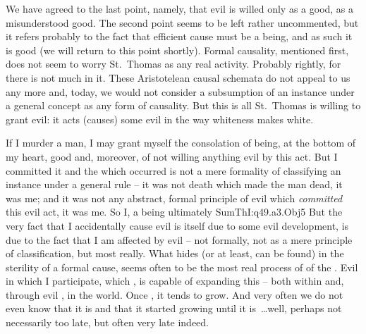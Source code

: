 We have agreed to the last point, namely, that evil is willed only as a good, as
a misunderstood good. The second point seems to be left rather uncommented, but
it refers probably to the fact that efficient cause must be a being, and as such
it is good (we will return to this point shortly). Formal causality, mentioned
first, does not seem to worry St.~Thomas as any real activity. Probably rightly, for
there is not much  in it. These Aristotelean causal schemata
do not appeal to us any more and, today, we would not consider a subsumption of
an instance under a general concept as any form of causality. But this is all
St.~Thomas is willing to grant evil: it acts (causes) some evil
in the way whiteness makes white.

If I murder a man, I may grant myself the consolation of being, at the bottom of
my heart, good and, moreover, of not willing anything evil by this act. But I
committed it and the  which occurred is not a mere
formality of classifying an instance under a general rule -- it was not death
which made the man dead, it was me; and it was not any abstract, formal
principle of evil which {\em committed} this evil act, it was me. So I, a being
ultimately \citet{good is the accidental cause of evil.}{SumTh}{I:q49.a3.Obj5}
But the very fact that I accidentally cause evil is itself due to some evil
development, is due to the fact that I am affected by evil -- not formally, not
as a mere principle of classification, but most really. What hides (or at least,
can be found) in the sterility of a formal cause, seems often to be the most
real process of  of the .  Evil in which I participate, which , is capable of
 expanding this  -- both within  and,
through  evil , in the world.  Once , it tends to
grow. And very often we do not even know that it is  and that it
started growing until it is~\ldots well, perhaps not necessarily too late, but
often very late indeed.


